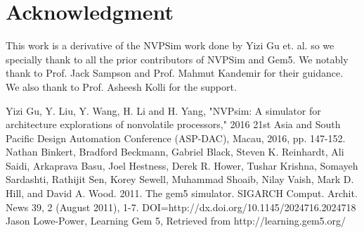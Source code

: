 \documentclass[conference]{IEEEtran}
\begin{document}
\section*{\textbf{Acknowledgment}}

This work is a derivative of the NVPSim work done by Yizi Gu et. al. so we specially thank to all the prior contributors of NVPSim and Gem5. We notably thank to Prof. Jack Sampson and Prof. Mahmut Kandemir for their guidance. We also thank to Prof. Asheesh Kolli for the support.

\begin{thebibliography}{00}
Yizi Gu, Y. Liu, Y. Wang, H. Li and H. Yang, "NVPsim: A simulator for architecture explorations of nonvolatile processors," 2016 21st Asia and South Pacific Design Automation Conference (ASP-DAC), Macau, 2016, pp. 147-152.
Nathan Binkert, Bradford Beckmann, Gabriel Black, Steven K. Reinhardt, Ali Saidi, Arkaprava Basu, Joel Hestness, Derek R. Hower, Tushar Krishna, Somayeh Sardashti, Rathijit Sen, Korey Sewell, Muhammad Shoaib, Nilay Vaish, Mark D. Hill, and David A. Wood. 2011. The gem5 simulator. SIGARCH Comput. Archit. News 39, 2 (August 2011), 1-7. DOI=http://dx.doi.org/10.1145/2024716.2024718
 Jason Lowe-Power, Learning Gem 5, Retrieved from http://learning.gem5.org/
\end{thebibliography}
\vspace{12pt}
\end{document}
